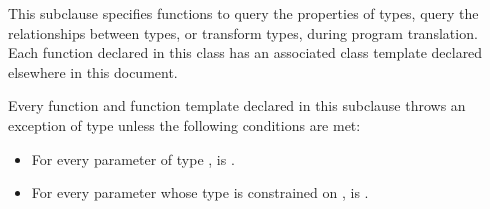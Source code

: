 \pnum
This subclause specifies  functions to
query the properties of types,
query the relationships between types, or
transform types,
during program translation.
Each  function declared in this class
has an associated class template declared elsewhere in this document.

\pnum
Every function and function template declared in this subclause
throws an exception of type 
unless the following conditions are met:
\begin{itemize}
\item
  For every parameter  of type ,
   is .
\item
  For every parameter 
  whose type is constrained on ,
   is .
\end{itemize}

